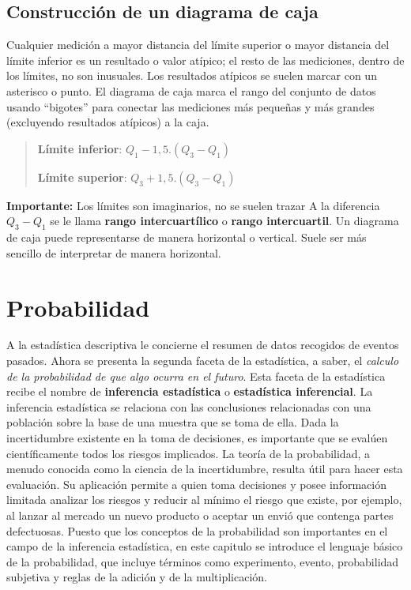 \documentclass[]{article}
\begin{document}
\subsection*{Construcción de un diagrama de caja}
Cualquier medición a mayor distancia del límite superior o mayor distancia del límite inferior es un resultado o valor atípico; el resto de las mediciones, dentro de los límites, no son inusuales. Los resultados atípicos se suelen marcar con un asterisco o punto. El diagrama de caja marca el rango del conjunto de datos usando “bigotes” para conectar las mediciones más pequeñas y más grandes (excluyendo resultados atípicos) a la caja.
\begin{quote}
	\textbf{Límite inferior}: $Q_{1} - 1,5.(Q_{3} - Q_{1})$
	\item \textbf{Límite superior}: $Q_{3} + 1,5.(Q_{3} - Q_{1})$
\end{quote}
\textbf{Importante: }Los límites son imaginarios, no se suelen trazar
A la diferencia \textbf{$Q_{3} - Q_{1}$} se le llama \textbf{rango intercuartílico} o \textbf{rango intercuartil}.
Un diagrama de caja puede representarse de manera horizontal o vertical. Suele ser más sencillo de interpretar de manera horizontal.
\pagebreak
\section{Probabilidad}
A la estadística descriptiva le concierne el resumen de datos recogidos de eventos pasados. Ahora se presenta la segunda faceta de la estadística, a saber, el \textit{calculo de la probabilidad de que algo ocurra en el futuro}. Esta faceta de la estadística recibe el nombre de \textbf{inferencia estadística} o \textbf{estadística inferencial}. La inferencia estadística se relaciona con las conclusiones relacionadas con una población sobre la base de una muestra que se toma de ella. Dada la incertidumbre existente en la toma de decisiones, es importante que se evalúen científicamente todos los riesgos implicados. La teoría de la probabilidad, a menudo conocida como la ciencia de la incertidumbre, resulta útil para hacer esta evaluación. Su aplicación permite a quien toma decisiones y posee información limitada analizar los riesgos y reducir al mínimo el riesgo que existe, por ejemplo, al lanzar al mercado un nuevo producto o aceptar un envió que contenga partes defectuosas. Puesto que los conceptos de la probabilidad son importantes en el campo de la inferencia estadística, en este capitulo se introduce el lenguaje básico de la probabilidad, que incluye términos como experimento, evento, probabilidad subjetiva y reglas de la adición y de la multiplicación.
\end{document}
